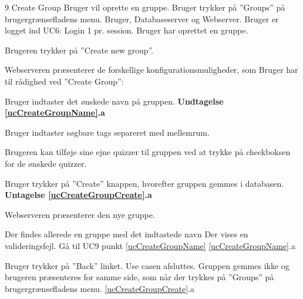 
\uchead
	{9}
	{Create Group}
	{Bruger vil oprette en gruppe.}
	{Bruger trykker på ''Groups'' på brugergrænsefladens menu.}
	{Bruger, Databaseserver og Webserver.}
	{Bruger er logget ind} %
	{UC6: Login}
	{1 pr. session.}
	{Bruger har oprettet en gruppe.}
\item Brugeren trykker på ''Create new group''.

\item Webserveren præsenterer de forskellige konfigurationsmuligheder, som Bruger har til rådighed ved ''Create Group'':

\item \label{ucCreateGroupName} Bruger indtaster det ønskede navn på gruppen. \textbf{Undtagelse \ref{ucCreateGroupName}.a}

\item Bruger indtaster søgbare tags separeret med mellemrum.
\item Brugeren kan tilføje sine ejne quizzer til gruppen ved at trykke på checkboksen for de ønskede quizzer.

\item \label{ucCreateGroupCreate} Bruger trykker på ''Create'' knappen, hvorefter gruppen gemmes i databasen.
\textbf{Untagelse \ref{ucCreateGroupCreate}.a}

\item Webserveren præsenterer den nye gruppe.

\ucdescriptionend

\ucextension
	{Der findes allerede en gruppe med det indtastede navn}
	{Der vises en valideringsfejl. Gå til UC9 punkt \ref{ucCreateGroupName}}
	{\ref{ucCreateGroupName}.a}
		
\ucextension
	{Bruger trykker på ''Back'' linket.}
	{Use casen afsluttes. Gruppen gemmes ikke og brugeren præsenteres for samme side, som når der trykkes på ''Groups'' på brugergrænsefladens menu.}
	{\ref{ucCreateGroupCreate}.a}
